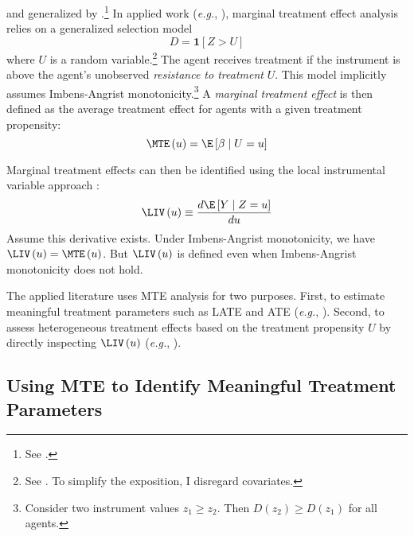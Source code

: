 and generalized by \citet{heckman1999local}.\footnote{See \citet{heckman2007econometricII}.}
In applied work (\emph{e.g.}, \citealt{Arnold2018Racial,Bhuller2020Incarceration}),
marginal treatment effect analysis relies on a generalized \citet{roy1951some}
selection model
\[
D=\mathbf{1}\left[Z>U\right]
\]
where $U$ is a random variable.\footnote{See \citet{heckman2007econometricI,heckman2007econometricII}. To
simplify the exposition, I disregard covariates.} The agent receives treatment if the instrument is above the agent's
unobserved \emph{resistance to treatment }$U$. This model implicitly
assumes Imbens-Angrist monotonicity.\footnote{Consider two instrument values $z_{1}\geq z_{2}$. Then $D\left(z_{2}\right)\geq D\left(z_{1}\right)$
for all agents.} A \emph{marginal treatment effect} is then defined as the average
treatment effect for agents with a given treatment propensity:
\[
\MTE\left(u\right)=\E\left[\beta\mid U=u\right]
\]

Marginal treatment effects can then be identified using the local
instrumental variable approach \citep{heckman1999local,heckman2005structural}:
\[
\LIV\left(u\right)\equiv\frac{d\E\left[Y\mid Z=u\right]}{du}
\]
Assume this derivative exists. Under Imbens-Angrist monotonicity,
we have $\LIV\left(u\right)=\MTE\left(u\right)$. But $\LIV\left(u\right)$
is defined even when Imbens-Angrist monotonicity does not hold.

The applied literature uses MTE analysis for two purposes. First,
to estimate meaningful treatment parameters such as LATE and ATE (\emph{e.g.},
\citealt{Arnold2018Racial,Bhuller2020Incarceration}). Second, to
assess heterogeneous treatment effects based on the treatment propensity
$U$ by directly inspecting $\LIV\left(u\right)$ (\emph{e.g.}, \citealt{doyle2007child,maestas2013does,french2014effect}).

\subsection{Using MTE to Identify Meaningful Treatment Parameters}

